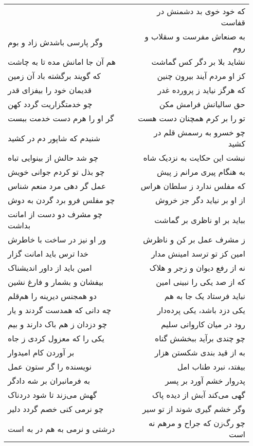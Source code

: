 \begin{center}
\begin{longtable}{l p{0.5cm} r}
&&
که خود خوی بد دشمنش در قفاست
\\
وگر پارسی باشدش زاد و بوم
&&
به صنعاش مفرست و سقلاب و روم
\\
هم آن جا امانش مده تا به چاشت
&&
نشاید بلا بر دگر کس گماشت
\\
که گویند برگشته باد آن زمین
&&
کز او مردم آیند بیرون چنین
\\
قدیمان خود را بیفزای قدر
&&
که هرگز نیاید ز پرورده غدر
\\
چو خدمتگزاریت گردد کهن
&&
حق سالیانش فرامش مکن
\\
گر او را هرم دست خدمت ببست
&&
تو را بر کرم همچنان دست هست
\\
شنیدم که شاپور دم در کشید
&&
چو خسرو به رسمش قلم در کشید
\\
چو شد حالش از بینوایی تباه
&&
نبشت این حکایت به نزدیک شاه
\\
چو بذل تو کردم جوانی خویش
&&
به هنگام پیری مرانم ز پیش
\\
عمل گر دهی مرد منعم شناس
&&
که مفلس ندارد ز سلطان هراس
\\
چو مفلس فرو برد گردن به دوش
&&
از او بر نیاید دگر جز خروش
\\
چو مشرف دو دست از امانت بداشت
&&
بباید بر او ناظری بر گماشت
\\
ور او نیز در ساخت با خاطرش
&&
ز مشرف عمل بر کن و ناظرش
\\
خدا ترس باید امانت گزار
&&
امین کز تو ترسد امینش مدار
\\
امین باید از داور اندیشناک
&&
نه از رفع دیوان و زجر و هلاک
\\
بیفشان و بشمار و فارغ نشین
&&
که از صد یکی را نبینی امین
\\
دو همجنس دیرینه را هم‌قلم
&&
نباید فرستاد یک جا به هم
\\
چه دانی که همدست گردند و یار
&&
یکی دزد باشد، یکی پرده‌دار
\\
چو دزدان ز هم باک دارند و بیم
&&
رود در میان کاروانی سلیم
\\
یکی را که معزول کردی ز جاه
&&
چو چندی برآید ببخشش گناه
\\
بر آوردن کام امیدوار
&&
به از قید بندی شکستن هزار
\\
نویسنده را گر ستون عمل
&&
بیفتد، نبرد طناب امل
\\
به فرمانبران بر شه دادگر
&&
پدروار خشم آورد بر پسر
\\
گهش می‌زند تا شود دردناک
&&
گهی می‌کند آبش از دیده پاک
\\
چو نرمی کنی خصم گردد دلیر
&&
وگر خشم گیری شوند از تو سیر
\\
درشتی و نرمی به هم در به است
&&
چو رگ‌زن که جراح و مرهم نه است

\end{longtable}
\end{center}
